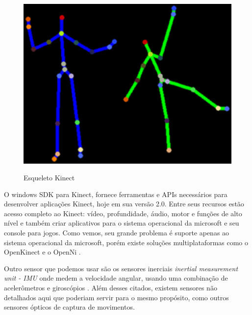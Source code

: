 \begin{figure}[!h]                                                               
\centering                                                                         
\includegraphics [keepaspectratio=true,scale=0.60]{figuras/esqueletoKinect.eps}                                
\caption{Esqueleto Kinect}                                        
\cite{microsoftResearch}
\label{esqueletokinect}                                                        
\end{figure}                                                                    

  O windows SDK para Kinect, fornece ferramentas e APIs necessários para desenvolver
aplicações Kinect, hoje em sua versão 2.0. Entre seus recursos estão acesso completo ao Kinect: vídeo,
profundidade, áudio, motor e funções de alto nível e também  criar aplicativos 
para o sistema operacional da microsoft e seu console para jogos. Como vemos, 
seu grande problema é suporte apenas ao sistema operacional da microsoft, porém
existe soluções multiplataformas como o OpenKinect \cite{openKinect} e o OpenNi \cite{openNI}.

  Outro sensor que podemos usar são os sensores inerciais \textit{inertial 
measurement unit - IMU} onde medem a velocidade angular, usando uma combinação 
de acelerômetros e giroscópios \cite{imu}. Além desses citados, existem sensores
não detalhados aqui que poderiam servir para o mesmo propósito, como outros sensores ópticos de captura de movimentos.

